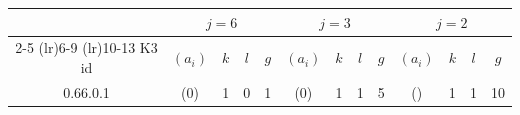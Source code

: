 {\small\centering\setlength{\tabcolsep}{3pt}
\begin{longtable}{ccccccccccccc}
 & \multicolumn{4}{c}{$j = 6$} & \multicolumn{4}{c}{$j = 3$} & \multicolumn{4}{c}{$j = 2$}\\
\cmidrule(lr){2-5}
\cmidrule(lr){6-9}
\cmidrule(lr){10-13}
K3 id & $(a_i)$ & $k$ & $l$ & $g$ & $(a_i)$ & $k$ & $l$ & $g$ & $(a_i)$ & $k$ & $l$ & $g$\\
\hline
\endhead
\rowcolor{lightgray}
0.66.0.1 & (0\:12) & 1 & 0 & 1 & (0) & 1 & 1 & 5 & () & 1 & 1 & 10\\
\hline\end{longtable}
}

